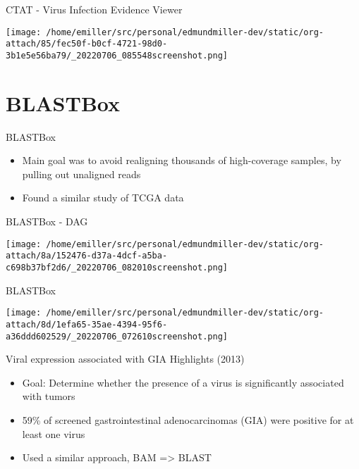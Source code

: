 \documentclass[bigger]{beamer}
\begin{document}
\begin{frame}[label={sec:orgfeeb926}]{CTAT - Virus Infection Evidence Viewer}
\begin{center}
\texttt{[image: /home/emiller/src/personal/edmundmiller-dev/static/org-attach/85/fec50f-b0cf-4721-98d0-3b1e5e56ba79/\_20220706\_085548screenshot.png]}
\end{center}
\end{frame}


\section*{BLASTBox}
\label{sec:org7c78ba8}

\begin{frame}[label={sec:org3f7f1fd}]{BLASTBox}
\begin{itemize}
\item Main goal was to \alert{avoid realigning} thousands of high-coverage samples, by
pulling out unaligned reads
\item Found a similar study of TCGA data
\end{itemize}
\end{frame}

\begin{frame}[label={sec:org663d677}]{BLASTBox - DAG}
\begin{center}
\texttt{[image: /home/emiller/src/personal/edmundmiller-dev/static/org-attach/8a/152476-d37a-4dcf-a5ba-c698b37bf2d6/\_20220706\_082010screenshot.png]}
\end{center}
\end{frame}

\begin{frame}[label={sec:org287cb57}]{BLASTBox}
\begin{center}
\texttt{[image: /home/emiller/src/personal/edmundmiller-dev/static/org-attach/8d/1efa65-35ae-4394-95f6-a36ddd602529/\_20220706\_072610screenshot.png]}
\end{center}
\end{frame}

\begin{frame}[label={sec:orgdaa01cb}]{Viral expression associated with GIA Highlights (2013)}
\begin{itemize}
\item Goal: Determine whether the presence of a virus is significantly associated
with tumors
\item 59\% of screened gastrointestinal adenocarcinomas (GIA) were positive for at
least one virus
\item Used a similar approach, BAM => BLAST
\end{itemize}
\end{frame}
\end{document}
